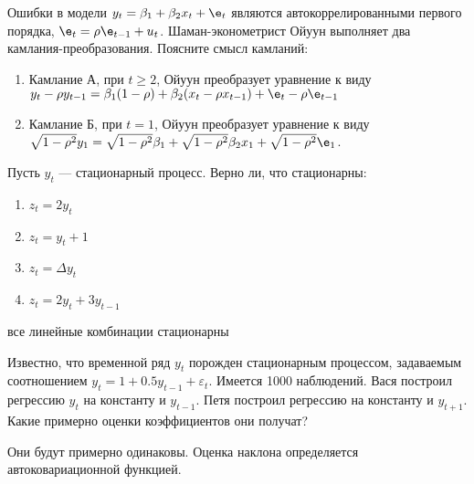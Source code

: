 \documentclass[pdftex,11pt,openany]{book}\usepackage[]{graphicx}\usepackage[]{color}
\begin{document}
\begin{problem}
Ошибки в модели $y_t=\beta_1+\beta_2 x_{t}+\e_t$ являются автокоррелированными первого порядка, $\e_t=\rho \e_{t-1}+u_t$. Шаман-эконометрист Ойуун выполняет два камлания-преобразования. Поясните смысл камланий:
\begin{enumerate}
\item Камлание А, при $t\geq 2$, Ойуун преобразует уравнение к виду $y_t-\rho y_{t-1}=\beta_1(1-\rho)+ \beta_2(x_t-\rho x_{t-1})+\e_t-\rho \e_{t-1}$
\item Камлание Б, при $t=1$, Ойуун преобразует уравнение к виду $\sqrt{1-\rho^2}y_1=\sqrt{1-\rho^2}\beta_1+\sqrt{1-\rho^2}\beta_2 x_1+\sqrt{1-\rho^2}\e_1$.
\end{enumerate}
\end{problem}

\begin{solution}
\end{solution}


\begin{problem}
Пусть $y_{t}$ --- стационарный процесс. Верно ли, что стационарны: 
\begin{enumerate}
\item $z_{t}=2y_{t}$ 
\item $z_{t}=y_{t}+1$ 
\item $z_{t}=\Delta y_{t}$ 
\item $z_{t}=2y_{t}+3y_{t-1}$ 
\end{enumerate} 
\end{problem}

\begin{solution}
все линейные комбинации стационарны
\end{solution}





\begin{problem}
Известно, что временной ряд $y_{t}$ порожден стационарным процессом, задаваемым соотношением $y_{t}=1+0.5y_{t-1}+\varepsilon_{t}$. Имеется 1000 наблюдений. Вася построил регрессию $y_{t}$ на константу и $y_{t-1}$. Петя построил регрессию на константу и $y_{t+1}$. Какие примерно оценки коэффициентов они получат? 
\end{problem}

\begin{solution}
Они будут примерно одинаковы. Оценка наклона определяется автоковариационной функцией.
\end{solution}
\end{document}
